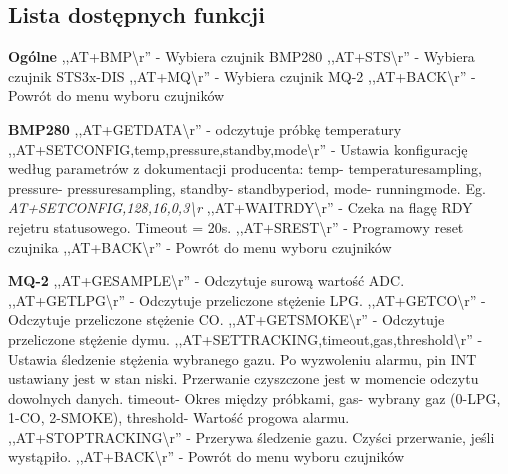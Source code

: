\subsection{Lista dostępnych funkcji}
\textbf{Ogólne}\newline
   ,,AT+BMP\textbackslash r'' - Wybiera czujnik BMP280\newline
   ,,AT+STS\textbackslash r'' - Wybiera czujnik STS3x-DIS\newline
   ,,AT+MQ\textbackslash r'' - Wybiera czujnik MQ-2\newline
   ,,AT+BACK\textbackslash r'' - Powrót do menu wyboru czujników\newline

\textbf{BMP280}\newline
   ,,AT+GETDATA\textbackslash r'' - odczytuje próbkę temperatury\newline
   ,,AT+SETCONFIG,\lbrack temp\rbrack,\lbrack pressure\rbrack,\lbrack standby\rbrack,\lbrack mode\rbrack\textbackslash r'' - Ustawia konfigurację według parametrów z dokumentacji producenta: \lbrack temp\rbrack - temperature\textunderscore sampling, \lbrack pressure\rbrack - pressure\textunderscore sampling, \lbrack standby\rbrack - standby\textunderscore period, \lbrack mode\rbrack - running\textunderscore mode. Eg. \textit{AT+SETCONFIG,128,16,0,3\textbackslash r}\newline
   ,,AT+WAITRDY\textbackslash r'' - Czeka na flagę RDY rejetru statusowego. Timeout = 20s.\newline
   ,,AT+SREST\textbackslash r'' - Programowy reset czujnika\newline
   ,,AT+BACK\textbackslash r'' - Powrót do menu wyboru czujników\newline

\textbf{MQ-2}\newline
   ,,AT+GESAMPLE\textbackslash r'' - Odczytuje surową wartość ADC.\newline
   ,,AT+GETLPG\textbackslash r'' - Odczytuje przeliczone stężenie LPG.\newline
   ,,AT+GETCO\textbackslash r'' - Odczytuje przeliczone stężenie CO.\newline
   ,,AT+GETSMOKE\textbackslash r'' - Odczytuje przeliczone stężenie dymu.\newline
   ,,AT+SETTRACKING,\lbrack timeout\rbrack,\lbrack gas\rbrack,\lbrack threshold\rbrack\textbackslash r'' - Ustawia śledzenie stężenia wybranego gazu. Po wyzwoleniu alarmu, pin INT ustawiany jest w stan niski. Przerwanie czyszczone jest w momencie odczytu dowolnych danych. \lbrack timeout\rbrack - Okres między próbkami, \lbrack gas\rbrack - wybrany gaz (0-LPG, 1-CO, 2-SMOKE), \lbrack threshold\rbrack - Wartość progowa alarmu.\newline
   ,,AT+STOPTRACKING\textbackslash r'' - Przerywa śledzenie gazu. Czyści przerwanie, jeśli wystąpiło. \newline
   ,,AT+BACK\textbackslash r'' - Powrót do menu wyboru czujników\newline

